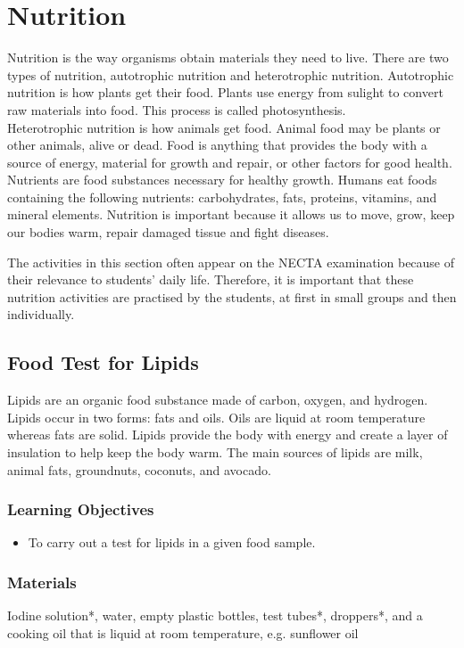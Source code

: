 \section{Nutrition}
Nutrition is the way organisms obtain materials they need to live. There are two types of nutrition, autotrophic nutrition and heterotrophic nutrition. Autotrophic nutrition is how plants get their food. Plants use energy from sulight to convert raw materials into food. This process is called photosynthesis. \\Heterotrophic nutrition is how animals get food. Animal food may be plants or other animals, alive or dead. Food is anything that provides the body with a source of energy, material for growth and repair, or other factors for good health. Nutrients are food substances necessary for healthy growth. Humans eat foods containing the following nutrients: carbohydrates, fats, proteins, vitamins, and mineral elements. Nutrition is important because it allows us to move, grow, keep our bodies warm, repair damaged tissue and fight diseases.

The activities in this section often appear on the NECTA examination because of their relevance to students' daily life. Therefore, it is important that these nutrition activities are practised by the students, at first in small groups and then individually.

\subsection{Food Test for Lipids}
Lipids are an organic food substance made of carbon, oxygen, and hydrogen. Lipids occur in two forms: fats and oils. Oils are liquid at room temperature whereas fats are solid. Lipids provide the body with energy and create a layer of insulation to help keep the body warm. The main sources of lipids are milk, animal fats, groundnuts, coconuts, and avocado.

\subsubsection*{Learning Objectives}
\begin{itemize}
\item{To carry out a test for lipids in a given food sample.}
\end{itemize}

\subsubsection*{Materials}
Iodine solution*, water, empty plastic bottles, test tubes*, droppers*, and a cooking oil that is liquid at room temperature, e.g. sunflower oil

